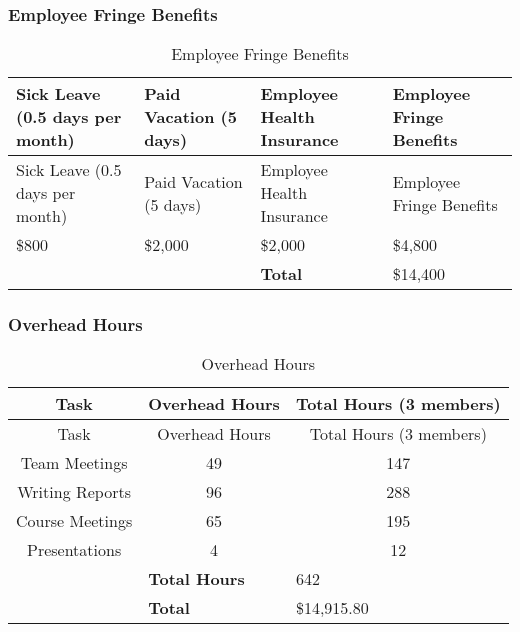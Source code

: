 \subsubsection{Employee Fringe Benefits}
\begin{center}
\setlength{\extrarowheight}{1.5pt}
  \begin{longtable}{|p{3cm}|p{3cm}|p{3cm}|p{3cm}|}
 \caption{Employee Fringe Benefits} \\
   \hline
  
  \centering Sick Leave (0.5 days per month) & Paid Vacation (5 days) & Employee Health Insurance & Employee Fringe Benefits \\
  \hline \hline \endfirsthead
  
     \hline

	\centering Sick Leave (0.5 days per month) & Paid Vacation (5 days) & Employee Health Insurance & Employee Fringe Benefits \\
	\hline \hline \endhead
  
  \endfoot  

    \$800 & \$2,000 & \$2,000 & \$4,800  \\ \hline
    \multicolumn{1}{l}{}      & \multicolumn{1}{l}{}      & \multicolumn{1}{l}{\textbf{Total}} & \multicolumn{1}{l}{\$14,400}  \\
          
           \end{longtable}
\end{center}

\subsubsection{Overhead Hours}

\begin{center}
\setlength{\extrarowheight}{1.5pt}
  \begin{longtable}{|c|c|c|}
 \caption{Overhead Hours\label{overheadHours}} \\
   \hline
  
  \centering Task & Overhead Hours & Total Hours (3 members) \\
  \hline \hline \endfirsthead
  
     \hline

	\centering Task & Overhead Hours & Total Hours (3 members) \\
	\hline \hline \endhead

 \endfoot  

	Team Meetings & 49 & 147 \\ \hline
	Writing Reports & 96 & 288 \\ \hline
	Course Meetings & 65 & 195 \\ \hline	  
	Presentations & 4 & 12 \\ \hline
  \multicolumn{1}{l}{}      & \multicolumn{1}{l}{\textbf{Total Hours}} & \multicolumn{1}{l}{642}  \\
  \multicolumn{1}{l}{}      & \multicolumn{1}{l}{\textbf{Total}} & \multicolumn{1}{l}{\$14,915.80}  \\
    \end{longtable}
\end{center}
